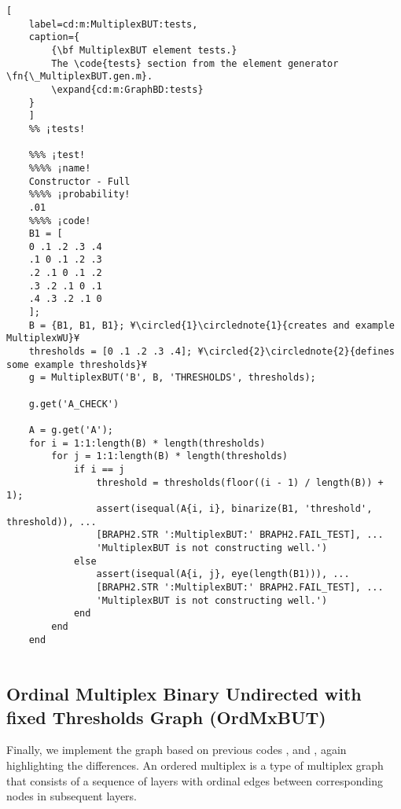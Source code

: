 \documentclass{tufte-handout}
\begin{document}
\begin{lstlisting}[
	label=cd:m:MultiplexBUT:tests,
	caption={
		{\bf MultiplexBUT element tests.}
		The \code{tests} section from the element generator \fn{\_MultiplexBUT.gen.m}.
		\expand{cd:m:GraphBD:tests}
	}
	]
	%% ¡tests!
	
	%%% ¡test!
	%%%% ¡name!
	Constructor - Full
	%%%% ¡probability!
	.01
	%%%% ¡code!
	B1 = [
	0 .1 .2 .3 .4 
	.1 0 .1 .2 .3
	.2 .1 0 .1 .2
	.3 .2 .1 0 .1
	.4 .3 .2 .1 0
	]; 
	B = {B1, B1, B1}; ¥\circled{1}\circlednote{1}{creates and example MultiplexWU}¥
	thresholds = [0 .1 .2 .3 .4]; ¥\circled{2}\circlednote{2}{defines some example thresholds}¥
	g = MultiplexBUT('B', B, 'THRESHOLDS', thresholds);
	
	g.get('A_CHECK')
	
	A = g.get('A');
	for i = 1:1:length(B) * length(thresholds)
		for j = 1:1:length(B) * length(thresholds)
			if i == j
				threshold = thresholds(floor((i - 1) / length(B)) + 1);
				assert(isequal(A{i, i}, binarize(B1, 'threshold', threshold)), ...
				[BRAPH2.STR ':MultiplexBUT:' BRAPH2.FAIL_TEST], ...
				'MultiplexBUT is not constructing well.')
			else
				assert(isequal(A{i, j}, eye(length(B1))), ...
				[BRAPH2.STR ':MultiplexBUT:' BRAPH2.FAIL_TEST], ...
				'MultiplexBUT is not constructing well.')            
			end
		end
	end
	
\end{lstlisting}



\clearpage

\subsection{Ordinal Multiplex Binary Undirected with fixed Thresholds Graph (OrdMxBUT)}

Finally, we implement the  graph based on previous codes ,  and , again highlighting the differences. An ordered multiplex is a type of multiplex graph that consists of a sequence of layers with ordinal edges between corresponding nodes in subsequent layers.
\end{document}
